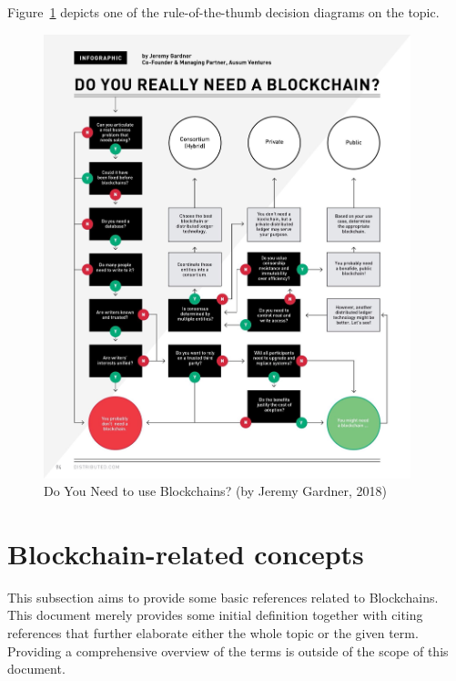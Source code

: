 \documentclass[a4paper]{article}
\begin{document}
Figure~\ref{fig:BC_Do_You_Need} depicts one of the rule-of-the-thumb decision diagrams on the topic.
\begin{figure}[H]
    \centering
    \includegraphics[width=0.95\textwidth]{figures/DoYouNeedBC.jpg}
    \caption{Do You Need to use Blockchains? (by Jeremy Gardner, 2018)}
    \label{fig:BC_Do_You_Need}
\end{figure}


\section{Blockchain-related concepts}

This subsection aims to provide some basic references related to Blockchains. This document merely provides some initial definition together with citing references that further elaborate either the whole topic or the given term. Providing a comprehensive overview of the terms is outside of the scope of this document.
\end{document}
